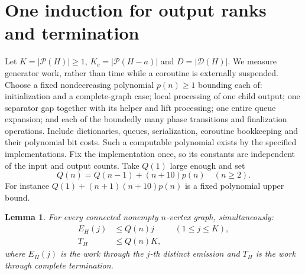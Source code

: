 \documentclass[acmsmall,12pt,screen,nonacm]{acmart}
\newtheorem{lemma}[theorem]{Lemma}
\newcommand{\PMC}{\mathcal P}
\newcommand{\Sep}{\mathcal D}
\begin{document}
\section{One induction for output ranks and termination}\label{sec:timing}

Let $K=|\PMC(H)|\ge1$, $K_c=|\PMC(H-a)|$ and $D=|\Sep(H)|$.
We measure generator work, rather than time while a coroutine is externally
suspended. Choose a fixed nondecreasing polynomial $p(n)\ge1$ bounding each
of: initialization and a complete-graph case; local processing of one child
output; one separator gap together with its helper and lift processing; one
entire queue expansion; and each of the boundedly many phase transitions
and finalization operations. Include dictionaries, queues, serialization,
coroutine bookkeeping and their polynomial bit costs. Such a computable
polynomial exists by the specified implementations. Fix the implementation
once, so its constants are independent of the input and output counts.
Take $Q(1)$ large enough and set
\begin{equation}\label{eq:recurrence}
 Q(n)=Q(n-1)+(n+10)p(n)\quad(n\ge2).
\end{equation}
For instance $Q(1)+(n+1)(n+10)p(n)$ is a fixed polynomial upper bound.

\begin{lemma}\label{lem:timing}
For every connected nonempty $n$-vertex graph, simultaneously:
\begin{align}
 E_H(j)&\le Q(n)j &&(1\le j\le K),\label{eq:prefix}\\
 T_H&\le Q(n)K,\label{eq:termination}
\end{align}
where $E_H(j)$ is the work through the $j$-th distinct emission and $T_H$ is
the work through complete termination.
\end{lemma}
\end{document}
